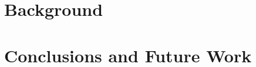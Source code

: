 \documentclass[final,1p,times]{elsarticle}
\begin{document}
\section{Background}\label{sec:background}

\section{Conclusions and Future Work}\label{sec:conclusions}





\end{document}
